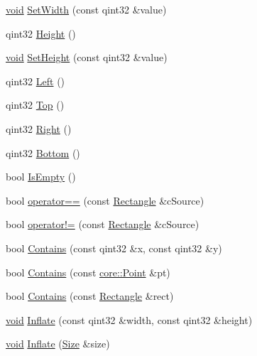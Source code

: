 \begin{DoxyCompactItemize}
\item 
\hyperlink{group___u_a_v_objects_plugin_ga444cf2ff3f0ecbe028adce838d373f5c}{void} \hyperlink{group___o_p_map_widget_gadf0be7cce382491567f5eceec5dbb0a2}{\-Set\-Width} (const qint32 \&value)
\item 
qint32 \hyperlink{group___o_p_map_widget_gaef58ba0ac7584cbe21ca8e4763187ffc}{\-Height} ()
\item 
\hyperlink{group___u_a_v_objects_plugin_ga444cf2ff3f0ecbe028adce838d373f5c}{void} \hyperlink{group___o_p_map_widget_ga88adf48284c51b739196968be6fa880b}{\-Set\-Height} (const qint32 \&value)
\item 
qint32 \hyperlink{group___o_p_map_widget_ga63b6483e8a88de2d85d97e8d97477133}{\-Left} ()
\item 
qint32 \hyperlink{group___o_p_map_widget_gaa6e68777faa43b088a20ae9e33b964dd}{\-Top} ()
\item 
qint32 \hyperlink{group___o_p_map_widget_ga3d473ded37080d218c696415f34d7141}{\-Right} ()
\item 
qint32 \hyperlink{group___o_p_map_widget_ga9c67095a9af32efd25d873638e82a4d6}{\-Bottom} ()
\item 
bool \hyperlink{group___o_p_map_widget_ga62166310290103c5ae2f9fa8f2897108}{\-Is\-Empty} ()
\item 
bool \hyperlink{group___o_p_map_widget_ga7035d0d861ec954d00fbfac5b0294105}{operator==} (const \hyperlink{structinternals_1_1_rectangle}{\-Rectangle} \&c\-Source)
\item 
bool \hyperlink{group___o_p_map_widget_ga646c7f23cab3711b80ef2a20056acdf0}{operator!=} (const \hyperlink{structinternals_1_1_rectangle}{\-Rectangle} \&c\-Source)
\item 
bool \hyperlink{group___o_p_map_widget_ga9a50cb554ff687d93a14da4f11d11bd1}{\-Contains} (const qint32 \&x, const qint32 \&y)
\item 
bool \hyperlink{group___o_p_map_widget_gae21b00316ef3c6fc871a429a41261624}{\-Contains} (const \hyperlink{structcore_1_1_point}{core\-::\-Point} \&pt)
\item 
bool \hyperlink{group___o_p_map_widget_gaaaaf9a5129b7af2409ad9a9e54698206}{\-Contains} (const \hyperlink{structinternals_1_1_rectangle}{\-Rectangle} \&rect)
\item 
\hyperlink{group___u_a_v_objects_plugin_ga444cf2ff3f0ecbe028adce838d373f5c}{void} \hyperlink{group___o_p_map_widget_ga75ec4589acf2aef1446a948b34b40cb9}{\-Inflate} (const qint32 \&width, const qint32 \&height)
\item 
\hyperlink{group___u_a_v_objects_plugin_ga444cf2ff3f0ecbe028adce838d373f5c}{void} \hyperlink{group___o_p_map_widget_ga60b97161857418ee4ec8a2def48176e8}{\-Inflate} (\hyperlink{structcore_1_1_size}{\-Size} \&size)

\end{DoxyCompactItemize}
